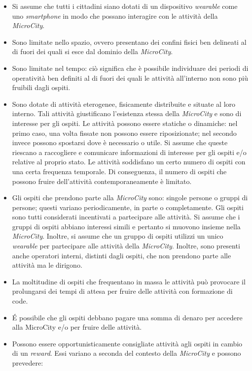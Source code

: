 \begin{itemize}
    \item Si assume che tutti i cittadini siano dotati di un dispositivo \textit{wearable} come uno \textit{smartphone} in modo che possano interagire con le attività della \textit{MicroCity}.
    \item Sono limitate nello spazio, ovvero presentano dei confini fisici ben delineati al di fuori dei quali si esce dal dominio della \textit{MicroCity}.
    \item Sono limitate nel tempo: ciò significa che è possibile individuare dei periodi di operatività ben definiti al di fuori dei quali le attività all'interno non sono più fruibili dagli ospiti.
    \item Sono dotate di attività eterogenee, fisicamente distribuite e situate al loro interno. Tali attività giustificano l'esistenza stessa della \textit{MicroCity} e sono di interesse per gli ospiti. Le attività possono essere statiche o dinamiche: nel primo caso, una volta fissate non possono essere riposizionate; nel secondo invece possono spostarsi dove è necessario o utile. Si assume che queste riescano a raccogliere e comunicare informazioni di interesse per gli ospiti e/o relative al proprio stato.
    Le attività soddisfano un certo numero di ospiti con una certa frequenza temporale. Di conseguenza, il numero di ospiti che possono fruire dell'attività contemporaneamente è limitato.
    \item Gli ospiti che prendono parte alla \textit{MicroCity} sono: singole persone o gruppi di persone; questi variano periodicamente, in parte o completamente. Gli ospiti sono tutti considerati incentivati a partecipare alle attività.
    Si assume che i gruppi di ospiti abbiano interessi simili e pertanto si muovono insieme nella \textit{MicroCity}. Inoltre, si assume che un gruppo di ospiti utilizzi un unico \textit{wearable} per partecipare alle attività della \textit{MicroCity}.
    Inoltre, sono presenti anche operatori interni, distinti dagli ospiti, che non prendono parte alle attività ma le dirigono.
    \item La moltitudine di ospiti che frequentano in massa le attività può provocare il prolungarsi dei tempi di attesa per fruire delle attività con formazione di code.
    \item \'E possibile che gli ospiti debbano pagare una somma di denaro per accedere alla MicroCity e/o per fruire delle attività.
    \item Possono essere opportunisticamente consigliate  attività agli ospiti in cambio di un \textit{reward}. Essi variano a seconda del contesto della \textit{MicroCity} e possono prevedere:

\end{itemize}
